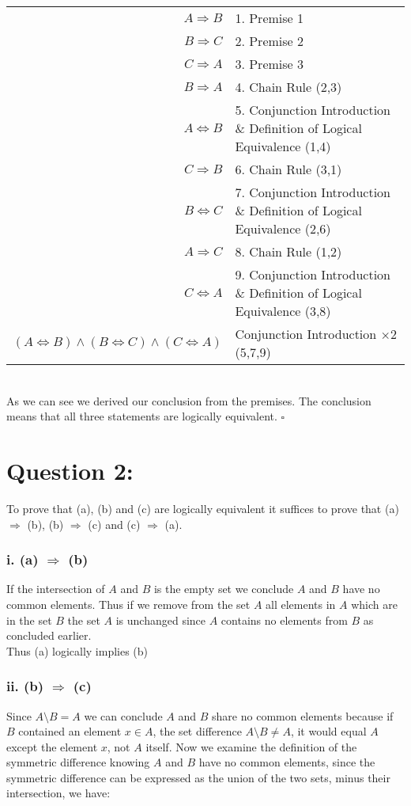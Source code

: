 \documentclass{article}
\begin{document}
\begin{table}[htp]
    \centering
    \begin{tabular}{rl}
        $A\Rightarrow B$ & 1. Premise 1\\
        $B\Rightarrow C$ & 2. Premise 2\\
        $C\Rightarrow A$ & 3. Premise 3\\
        $B\Rightarrow A$ & 4. Chain Rule (2,3)\\
        $A\Leftrightarrow B$ & 5. Conjunction Introduction \& Definition of Logical Equivalence (1,4)\\
        $C\Rightarrow B$ & 6. Chain Rule (3,1)\\
        $B\Leftrightarrow C$ & 7. Conjunction Introduction \& Definition of Logical Equivalence (2,6)\\
        $A\Rightarrow C$ & 8. Chain Rule (1,2)\\
        $C\Leftrightarrow A$ & 9. Conjunction Introduction \& Definition of Logical Equivalence (3,8)\\
        $(A \Leftrightarrow B) \land (B \Leftrightarrow C) \land( C \Leftrightarrow A)$ & Conjunction Introduction $\times 2$ (5,7,9)
    \end{tabular}
\end{table}
 \\
 As we can see we derived our conclusion from the premises. The conclusion means that all three statements are logically equivalent. $\square$
 \newpage
 \section*{Question 2:}
 To prove that (a), (b) and (c) are logically  equivalent it suffices to prove that (a) $\Rightarrow$ (b), (b) $\Rightarrow$ (c) and (c) $\Rightarrow$ (a).
\subsubsection*{i. (a) $\Rightarrow$ (b)}
If the intersection of $A$ and $B$ is the empty set we conclude $A$ and $B$ have no common elements. Thus if we remove from the set $A$ all elements in $A$ which are in the set $B$ the set $A$ is unchanged since $A$ contains no elements from $B$ as concluded earlier.\\Thus (a) logically implies (b)

\subsubsection*{ii. (b) $\Rightarrow$ (c)}
Since $A\setminus B = A$ we can conclude $A$ and $B$ share no common elements because if $B$ contained an element $x\in A$, the set difference $A\setminus B \neq A$, it would equal $A$ except the element $x$, not $A$ itself. Now we examine the definition of the symmetric difference knowing $A$ and $B$ have no common elements, since the symmetric difference can be expressed as the union of the two sets, minus their intersection, we have:
\end{document}
